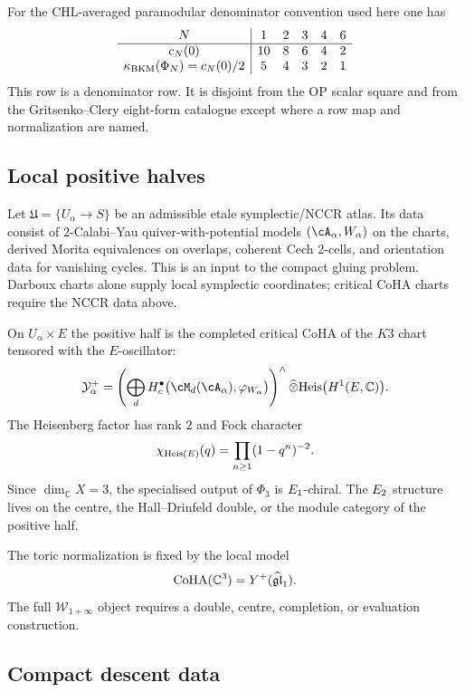 For the CHL-averaged paramodular denominator convention used here one has
\[
\begin{array}{c|ccccc}
N & 1 & 2 & 3 & 4 & 6\\
\hline
c_N(0) & 10 & 8 & 6 & 4 & 2\\
\kappa_{\mathrm{BKM}}(\Phi_N)=c_N(0)/2 & 5 & 4 & 3 & 2 & 1
\end{array}
\]
This row is a denominator row.  It is disjoint from the OP scalar square
and from the Gritsenko--Clery eight-form catalogue except where a row
map and normalization are named.

\subsection*{Local positive halves}

Let \(\mathfrak U=\{U_\alpha\to S\}\) be an admissible etale
symplectic/NCCR atlas.  Its data consist of \(2\)-Calabi--Yau
quiver-with-potential models \((\cA_\alpha,W_\alpha)\) on the charts,
derived Morita equivalences on overlaps, coherent Cech \(2\)-cells, and
orientation data for vanishing cycles.  This is an input to the compact
gluing problem.  Darboux charts alone supply local symplectic
coordinates; critical CoHA charts require the NCCR data above.

On \(U_\alpha\times E\) the positive half is the completed critical CoHA
of the \(K3\) chart tensored with the \(E\)-oscillator:
\[
  \mathcal Y_\alpha^{+}
  =
  \left(
  \bigoplus_{d}
  H_c^\bullet\bigl(\cM_d(\cA_\alpha),\varphi_{W_\alpha}\bigr)
  \right)^{\wedge}
  \widehat\otimes
  \Heis\bigl(H^1(E,\mathbb C)\bigr).
\]
The Heisenberg factor has rank \(2\) and Fock character
\[
  \chi_{\mathrm{Heis}(E)}(q)=\prod_{n\geq 1}(1-q^n)^{-2}.
\]
Since \(\dim_{\mathbb C}X=3\), the specialised output of \(\Phi_3\) is
\(E_{1}\)-chiral.  The \(E_{2}\) structure lives on the centre, the
Hall--Drinfeld double, or the module category of the positive half.

The toric normalization is fixed by the local model
\[
  \operatorname{CoHA}(\mathbb C^3)=Y^{+}(\widehat{\mathfrak{gl}}_1).
\]
The full \(\mathcal W_{1+\infty}\) object requires a double, centre,
completion, or evaluation construction.

\subsection*{Compact descent data}

